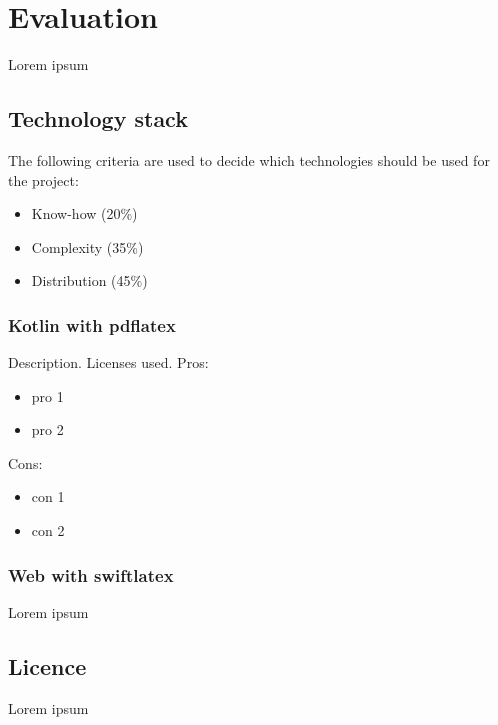 \section{Evaluation}
Lorem ipsum

\subsection{Technology stack}
The following criteria are used to decide which technologies should be used for the project:
\begin{itemize}
    \item Know-how (20\%)
    \item Complexity (35\%)
    \item Distribution (45\%)
\end{itemize}


\subsubsection{Kotlin with pdflatex}
Description. Licenses used. \newline
Pros:
\begin{itemize}
    \item pro 1
    \item pro 2
\end{itemize}
Cons:
\begin{itemize}
    \item con 1
    \item con 2
\end{itemize}

\subsubsection{Web with swiftlatex}
Lorem ipsum

\subsection{Licence}
Lorem ipsum